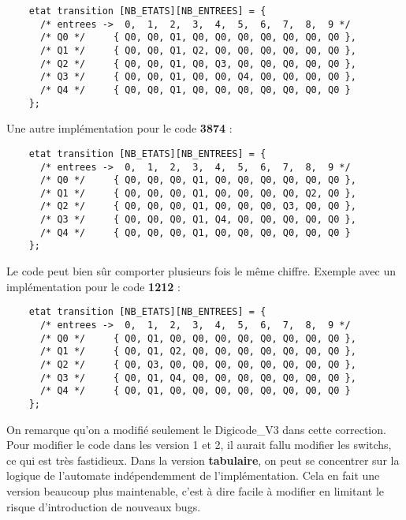 \documentclass[10pt]{article}
\begin{document}
\begin{enumerate}[label=\textbf{[\alph*]}]
  \lstset{style=transitionc}
  \begin{lstlisting}
    etat transition [NB_ETATS][NB_ENTREES] = {
      /* entrees ->  0,  1,  2,  3,  4,  5,  6,  7,  8,  9 */
      /* Q0 */     { Q0, Q0, Q1, Q0, Q0, Q0, Q0, Q0, Q0, Q0 },
      /* Q1 */     { Q0, Q0, Q1, Q2, Q0, Q0, Q0, Q0, Q0, Q0 },
      /* Q2 */     { Q0, Q0, Q1, Q0, Q3, Q0, Q0, Q0, Q0, Q0 },
      /* Q3 */     { Q0, Q0, Q1, Q0, Q0, Q4, Q0, Q0, Q0, Q0 },
      /* Q4 */     { Q0, Q0, Q1, Q0, Q0, Q0, Q0, Q0, Q0, Q0 }
    };
  \end{lstlisting}

  \newpage

  Une autre implémentation pour le code \textbf{3874} :

  \lstset{style=transitionc}
  \begin{lstlisting}
    etat transition [NB_ETATS][NB_ENTREES] = {
      /* entrees ->  0,  1,  2,  3,  4,  5,  6,  7,  8,  9 */
      /* Q0 */     { Q0, Q0, Q0, Q1, Q0, Q0, Q0, Q0, Q0, Q0 },
      /* Q1 */     { Q0, Q0, Q0, Q1, Q0, Q0, Q0, Q0, Q2, Q0 },
      /* Q2 */     { Q0, Q0, Q0, Q1, Q0, Q0, Q0, Q3, Q0, Q0 },
      /* Q3 */     { Q0, Q0, Q0, Q1, Q4, Q0, Q0, Q0, Q0, Q0 },
      /* Q4 */     { Q0, Q0, Q0, Q1, Q0, Q0, Q0, Q0, Q0, Q0 }
    };
  \end{lstlisting}

  Le code peut bien sûr comporter plusieurs fois le même
  chiffre. Exemple avec un implémentation pour le code \textbf{1212} :

  \lstset{style=transitionc}
  \begin{lstlisting}
    etat transition [NB_ETATS][NB_ENTREES] = {
      /* entrees ->  0,  1,  2,  3,  4,  5,  6,  7,  8,  9 */
      /* Q0 */     { Q0, Q1, Q0, Q0, Q0, Q0, Q0, Q0, Q0, Q0 },
      /* Q1 */     { Q0, Q1, Q2, Q0, Q0, Q0, Q0, Q0, Q0, Q0 },
      /* Q2 */     { Q0, Q3, Q0, Q0, Q0, Q0, Q0, Q0, Q0, Q0 },
      /* Q3 */     { Q0, Q1, Q4, Q0, Q0, Q0, Q0, Q0, Q0, Q0 },
      /* Q4 */     { Q0, Q1, Q0, Q0, Q0, Q0, Q0, Q0, Q0, Q0 }
    };
  \end{lstlisting}

\item On remarque qu'on a modifié seulement le Digicode\_V3 dans cette
  correction. Pour modifier le code dans les version 1 et 2, il aurait
  fallu modifier les switchs, ce qui est très fastidieux. Dans la
  version \textbf{tabulaire}, on peut se concentrer sur la logique de
  l'automate indépendemment de l'implémentation. Cela en fait une
  version beaucoup plus maintenable, c'est à dire facile à modifier
  en limitant le risque d'introduction de nouveaux bugs.\\


\end{enumerate}
\end{document}
